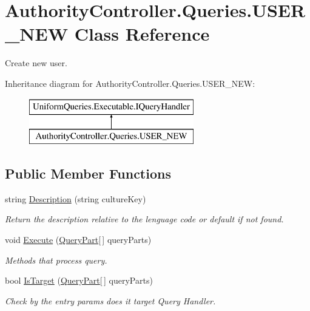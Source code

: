 \hypertarget{class_authority_controller_1_1_queries_1_1_u_s_e_r___n_e_w}{}\section{Authority\+Controller.\+Queries.\+U\+S\+E\+R\+\_\+\+N\+EW Class Reference}
\label{class_authority_controller_1_1_queries_1_1_u_s_e_r___n_e_w}


Create new user.  


Inheritance diagram for Authority\+Controller.\+Queries.\+U\+S\+E\+R\+\_\+\+N\+EW\+:\begin{figure}[H]
\begin{center}
\leavevmode
\includegraphics[height=2.000000cm]{d1/d07/class_authority_controller_1_1_queries_1_1_u_s_e_r___n_e_w}
\end{center}
\end{figure}
\subsection*{Public Member Functions}
\begin{DoxyCompactItemize}
\item 
string \mbox{\hyperlink{class_authority_controller_1_1_queries_1_1_u_s_e_r___n_e_w_ab0995d0559e0033ea963acaccb6e37bf}{Description}} (string culture\+Key)
\begin{DoxyCompactList}\small\item\em Return the description relative to the lenguage code or default if not found. \end{DoxyCompactList}\item 
void \mbox{\hyperlink{class_authority_controller_1_1_queries_1_1_u_s_e_r___n_e_w_afd715fb3d60e53ca7e3d55a4433f529c}{Execute}} (\mbox{\hyperlink{struct_uniform_queries_1_1_query_part}{Query\+Part}}\mbox{[}$\,$\mbox{]} query\+Parts)
\begin{DoxyCompactList}\small\item\em Methods that process query. \end{DoxyCompactList}\item 
bool \mbox{\hyperlink{class_authority_controller_1_1_queries_1_1_u_s_e_r___n_e_w_a6e26596b5a5ecc3d07591766b5d325ec}{Is\+Target}} (\mbox{\hyperlink{struct_uniform_queries_1_1_query_part}{Query\+Part}}\mbox{[}$\,$\mbox{]} query\+Parts)
\begin{DoxyCompactList}\small\item\em Check by the entry params does it target Query Handler. \end{DoxyCompactList}\end{DoxyCompactItemize}


